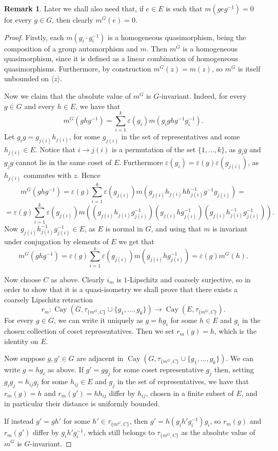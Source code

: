 \documentclass[svgnames]{amsart}
\theoremstyle{plain}
\theoremstyle{definition}
\newtheorem{rem}[thm]{Remark}
\newcommand{\Cay}[2]{\operatorname{Cay}\left(#1,#2\right)}
\begin{document}
\begin{rem}\label{rem:mG_trivial_on_adjacent_Zw}
    Later we shall also need that, if $e\in E$ is such that $m(geg^{-1})=0$ for every $g\in G$, then clearly $m^G(e)=0$. 
\end{rem}

\begin{proof}
Firstly, each $m(g_i \cdot g_i^{-1})$ is a homogeneous quasimorphism, being the composition of a group automorphism and $m$. Then $m^G$ is a homogeneous quasimorphism, since it is defined as a linear combination of homogeneous quasimorphisms. Furthermore, by construction $m^G(z)=m(z)$, so $m^G$ is itself unbounded on $\langle z\rangle$.


Now we claim that the absolute value of $m^G$ is $G$-invariant. Indeed, for every $g\in G$ and every $h\in E$, we have that
$$m^G(g h g^{-1})=\sum_{i=1}^k\varepsilon(g_i) m(g_ighg^{-1}g_i^{-1}).$$
Let $g_ig=g_{j(i)} h_{j(i)}$, for some $g_{j(i)}$ in the set of representatives and some $h_{j(i)}\in E$. Notice that $i\to j(i)$ is a permutation of the set $\{1, \ldots, k\}$, as $g_ig$ and $g_jg$ cannot lie in the same coset of $E$. Furthermore $\varepsilon(g_i)=\varepsilon(g)\varepsilon(g_{j(i)})$, as $h_{j(i)}$ commutes with $z$. Hence
$$m^G(g h g^{-1})=\varepsilon(g)\sum_{i=1}^k\varepsilon(g_{j(i)}) m(g_{j(i)}h_{j(i)}hh_{j(i)}^{-1}g^{-1}g_{j(i)})=$$
$$=\varepsilon(g)\sum_{i=1}^k\varepsilon(g_{j(i)}) m\left((g_{j(i)}h_{j(i)}g_{j(i)}^{-1})(g_{j(i)}hg_{j(i)}^{-1})(g_{j(i)}h_{j(i)}^{-1}g_{j(i)}^{-1})\right).$$
Now $g_{j(i)}h_{j(i)}^{-1}g_{j(i)}^{-1}\in E$, as $E$ is normal in $G$, and using that $m$ is invariant under conjugation by elements of $E$ we get that
$$m^G(g h g^{-1})=\varepsilon(g)\sum_{i=1}^k\varepsilon(g_{j(i)}) m\left(g_{j(i)}hg_{j(i)}^{-1}\right)=\varepsilon(g)m^G(h).$$



Now choose $C$ as above. Clearly $i_m$ is $1$-Lipschitz and coarsely surjective, so in order to show that it is a quasi-isometry we shall prove that there exists a coarsely Lipschitz retraction 
$$r_m\colon \Cay{G}{\tau_{\{m^G,C\}}\cup\{g_1,\ldots, g_k\}}\to \Cay{E}{\tau_{\{m^G,C\}}}.$$
For every $g\in G$, we can write it uniquely as $g=hg_i$ for some $h\in E$ and $g_i$ in the chosen collection of coset representatives. Then we set $r_m(g)=h$, which is the identity on $E$. 

Now suppose $g, g'\in G$ are adjacent in $\Cay{G}{\tau_{\{m^G,C\}}\cup\{g_1,\ldots, g_k\}}$. We can write $g=hg_i$ as above. If $g'=gg_j$ for some coset representative $g_j$ then, setting $g_ig_j=h_{ij}g_{l}$ for some $h_{ij}\in E$ and $g_j$ in the set of representatives, we have that $r_m(g)=h$ and $r_m(g')=hh_{ij}$ differ by $h_{ij}$, chosen in a finite subset of $E$, and in particular their distance is uniformly bounded.

If instead $g'=gh'$ for some $h'\in \tau_{\{m^G,C\}}$, then $g'=h(g_i h' g_i^{-1}) g_i$, so $r_m(g)$ and $r_m(g')$ differ by $g_i h' g_i^{-1}$, which still belongs to $\tau_{\{m^G,C\}}$ as the absolute value of $m^G$ is $G$-invariant.
\end{proof}
\end{document}
